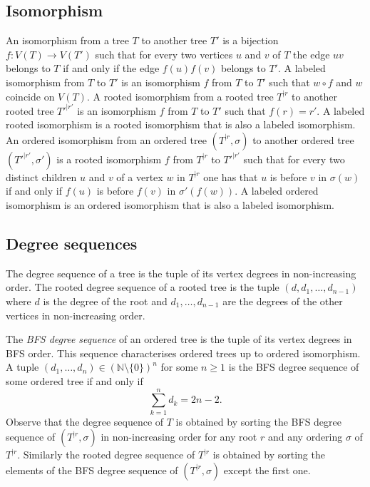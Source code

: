 \documentclass[11 pt]{modarticle}
\newcommand{\cN}{\mathbb{N}}
\newcommand{\wmap}{w}
\newcommand{\compose}{\mathbin{\circ}}
\newcommand{\vsetof}[1]{V(#1)}
\newcommand{\rtree}[2]{{#1}^{\lvert #2}}
\newcommand{\ortree}[3]{(\rtree{#1}{#2},{#3})}
\begin{document}
\subsection{Isomorphism}

An isomorphism from a tree $T$ to another tree $T'$ is a bijection $f\colon \vsetof{T} \to \vsetof{T'}$ such that for every two vertices $u$ and $v$ of $T$ the edge $uv$ belongs to $T$ if and only if the edge $f(u)f(v)$ belongs to $T'$. A labeled isomorphism from $T$ to $T'$ is an isomorphism $f$ from $T$ to $T'$ such that $\wmap \compose f$ and $\wmap$ coincide on $\vsetof{T}$. A rooted isomorphism from a rooted tree $\rtree{T}{r}$ to another rooted tree $\rtree{T'}{r'}$ is an isomorphism $f$ from $T$ to $T'$ such that $f(r) = r'$. A labeled rooted isomorphism is a rooted isomorphism that is also a labeled isomorphism. An ordered isomorphism from an ordered tree $\ortree{T}{r}{\sigma}$ to another ordered tree $\ortree{T'}{r'}{\sigma'}$ is a rooted isomorphism $f$ from $\rtree{T}{r}$ to $\rtree{T'}{r'}$ such that for every two distinct children $u$ and $v$ of a vertex $w$ in $\rtree{T}{r}$ one has that $u$ is before $v$ in $\sigma(w)$ if and only if $f(u)$ is before $f(v)$ in $\sigma'(f(w))$. A labeled ordered isomorphism is an ordered isomorphism that is also a labeled isomorphism.

\subsection{Degree sequences}

The degree sequence of a tree %
is the tuple %
of its vertex degrees in non-increasing order. The rooted degree sequence of a rooted tree is the tuple $(d, d_1, \dots, d_{n-1})$ where $d$ is the degree of the root and $d_1, \dots, d_{n-1}$ are the degrees of the other vertices  in non-increasing order.

The \emph{BFS degree sequence} of an ordered tree is the tuple of its vertex degrees in BFS order. This sequence characterises ordered trees up to ordered isomorphism. A tuple $(d_1, \dots, d_n) \in (\cN \setminus \{0\})^n$ for some $n \geq 1$ is the BFS degree sequence of some ordered tree if and only if
\begin{equation}
	\underset{k=1}{\overset{n}{\sum}} d_k = 2n - 2 \label{eq:valid-seq}.
\end{equation}
Observe that the degree sequence of $T$ is obtained by sorting the BFS degree sequence of $\ortree{T}{r}{\sigma}$ in non-increasing order for any root $r$ and any ordering $\sigma$ of $\rtree{T}{r}$. Similarly the rooted degree sequence of $\rtree{T}{r}$ is obtained by sorting the elements of the BFS degree sequence of $\ortree{T}{r}{\sigma}$ except the first one.
\end{document}

